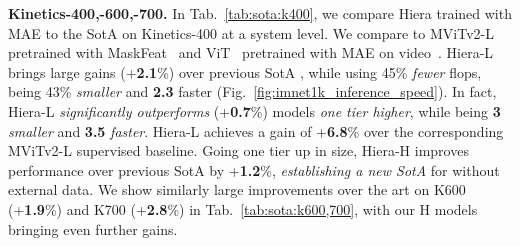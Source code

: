 \documentclass[nohyperref]{article}
\renewcommand{\paragraph}[1]{\vspace{1.25mm}\noindent\textbf{#1}}
\newcommand{\shortname}{{Hiera}}
\theoremstyle{plain}
\theoremstyle{definition}
\theoremstyle{remark}
\begin{document}
\paragraph{Kinetics-400,-600,-700.} In Tab.~\ref{tab:sota:k400}, we compare \shortname{} trained with MAE to the SotA on Kinetics-400 \cite{k400} at a system level. We compare to MViTv2-L~\cite{mvitv2} pretrained with MaskFeat~\cite{maskfeat} and ViT~\cite{vit} pretrained with MAE on video~\cite{mae-st,tong2022videomae}. \shortname{-L} brings large gains (+\textbf{2.1}\%) over previous SotA \cite{mae-st, tong2022videomae}, while using {\tiny}45\% \textit{fewer} flops, being {\tiny}43\% \textit{smaller} and \textbf{2.3} faster (Fig.~\ref{fig:imnet1k_inference_speed}). In fact, \shortname{-L} \textit{significantly outperforms} (+\textbf{0.7}\%) models \textit{one tier higher}, while being \textbf{3} \textit{smaller} and \textbf{3.5} \textit{faster}. \shortname{-L} achieves a gain of +\textbf{6.8}\% over the corresponding MViTv2-L supervised baseline. Going one tier up in size, \shortname{-H} improves performance over previous SotA by +\textbf{1.2}\%, \textit{establishing a new SotA} for  without external data. We show similarly large improvements over the art on K600 (+\textbf{1.9}\%) and K700 (+\textbf{2.8}\%) in Tab.~\ref{tab:sota:k600,700}, with our H models bringing even further gains.
\end{document}
